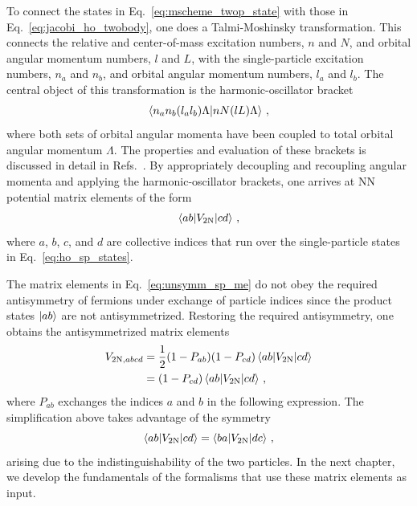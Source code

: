 To connect the states in Eq.~\eqref{eq:mscheme_twop_state} with those in Eq.~\eqref{eq:jacobi_ho_twobody},
one does a Talmi-Moshinsky transformation.
This connects the relative and center-of-mass excitation numbers, $n$ and $N$,
and orbital angular momentum numbers, $l$ and $L$,
with the single-particle excitation numbers, $n_a$ and $n_b$,
and orbital angular momentum numbers, $l_a$ and $l_b$.
The central object of this transformation is the harmonic-oscillator bracket
\begin{equation}
  \braket{n_a n_b (l_a l_b) \Lambda | n N (l L) \Lambda}\,,
\end{equation}
where both sets of orbital angular momenta have been coupled to total orbital angular momentum $\Lambda$.
The properties and evaluation of these brackets is discussed in detail in Refs.~\cite{Mosh59hobr,Buck96hobr}.
By appropriately decoupling and recoupling angular momenta
and applying the harmonic-oscillator brackets,
one arrives at NN potential matrix elements of the form
\begin{equation}\label{eq:unsymm_sp_me}
  \braket{ab | V_{2\text{N}} | cd}\,,
\end{equation}
where $a$, $b$, $c$, and $d$ are collective indices
that run over the single-particle states in Eq.~\eqref{eq:ho_sp_states}.

The matrix elements in Eq.~\eqref{eq:unsymm_sp_me}
do not obey the required antisymmetry of fermions under exchange of particle indices
since the product states $\ket{ab}$ are not antisymmetrized.
Restoring the required antisymmetry,
one obtains the antisymmetrized matrix elements
\begin{align}
  V_{2\text{N},abcd} & = \frac{1}{2}(1 - P_{ab})(1 - P_{cd})\braket{ab | V_{2\text{N}} | cd} \\
                     & = (1 - P_{cd}) \braket{ab | V_{2\text{N}} | cd}\,,
\end{align}
where $P_{ab}$ exchanges the indices $a$ and $b$ in the following expression.
The simplification above takes advantage of the symmetry
\begin{equation}
  \braket{ab | V_{2\text{N}} | cd} = \braket{ba | V_{2\text{N}} | dc}\,,
\end{equation}
arising due to the indistinguishability of the two particles.
In the next chapter, we develop the fundamentals of the formalisms
that use these matrix elements as input.
